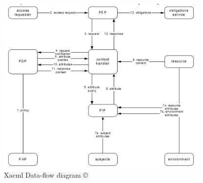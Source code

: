  \begin{figure}[h!]
\begin{center}
\includegraphics[height=3.5in]{xacml.png}
\caption{Xacml Data-flow diagram  \copyright \cite{xacml}}
\end{center}
\end{figure}
 
